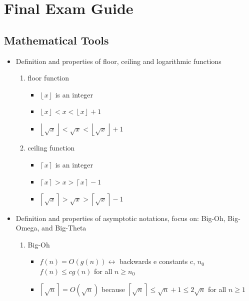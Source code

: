 

\section{Final Exam Guide}

\subsection{Mathematical Tools}
  \begin{itemize}
  \item Definition and properties of floor, ceiling and logarithmic functions
    \begin{enumerate}
    \item floor function
      \begin{itemize}
      \item $\left\lfloor x\right\rfloor$ is an integer
      \item $\left\lfloor x\right\rfloor < x < \left\lfloor x\right\rfloor+1$
      \item $\left\lfloor\sqrt{x}\right\rfloor < \sqrt{x} < \left\lfloor\sqrt{x}\right\rfloor+1$
      \end{itemize}
    \item ceiling function
      \begin{itemize}
      \item $\left\lceil x \right\rceil$ is an integer
      \item $\left\lceil x \right\rceil > x > \left\lceil x \right\rceil-1$
      \item $\left\lceil\sqrt{x}\right\rceil > \sqrt{x} > \left\lceil\sqrt{x}\right\rceil-1$
      \end{itemize}
    \end{enumerate}
  \item Definition and properties of asymptotic notations, focus on: Big-Oh, Big-Omega, and Big-Theta
    \begin{enumerate}
    \item Big-Oh
      \begin{itemize}
      \item $f(n)=O(g(n)) \leftrightarrow$ backwards e constants c, $n_{0}$ $f(n) \leq cg(n)$ for all $n\geq n_{0}$
      \item $\left\lceil\sqrt{n}\right\rceil=O(\sqrt{n})$ because $\left\lceil\sqrt{n}\right\rceil\leq\sqrt{n}+1\leq 2\sqrt{n}$ for all $n\geq 1$

\end{itemize}
\end{enumerate}
\end{itemize}
